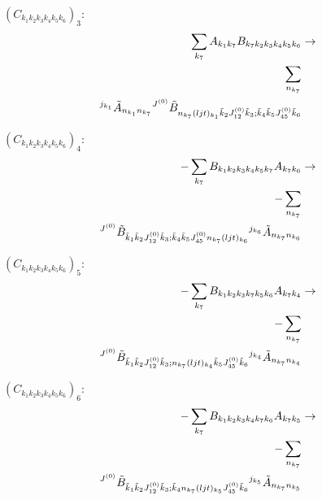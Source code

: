 \documentclass[11pt]{article}
\begin{document}
$\left({C}_{{k}_{1}{k}_{2}{k}_{3}{k}_{4}{k}_{5}{k}_{6}}\right)_{3}$:
\begin{align}
\sum_{{k}_{7}}{A}_{{k}_{1}{k}_{7}}{B}_{{k}_{7}{k}_{2}{k}_{3}{k}_{4}{k}_{5}{k}_{6}}&\rightarrow \notag \\\sum_{n_{{k}_{7}}}& \notag \\{}^{j_{{k}_{1}}}\tilde{A}_{n_{{k}_{1}}n_{{k}_{7}}}{}^{J^{(0)}}\tilde{B}_{n_{{k}_{7}}(ljt)_{{k}_{1}}\tilde{k}_{2}J^{(0)}_{12}\tilde{k}_{3};\tilde{k}_{4}\tilde{k}_{5}J^{(0)}_{45}\tilde{k}_{6}}& \notag \\
\end{align}

$\left({C}_{{k}_{1}{k}_{2}{k}_{3}{k}_{4}{k}_{5}{k}_{6}}\right)_{4}$:
\begin{align}
-\sum_{{k}_{7}}{B}_{{k}_{1}{k}_{2}{k}_{3}{k}_{4}{k}_{5}{k}_{7}}{A}_{{k}_{7}{k}_{6}}&\rightarrow \notag \\-\sum_{n_{{k}_{7}}}& \notag \\{}^{J^{(0)}}\tilde{B}_{\tilde{k}_{1}\tilde{k}_{2}J^{(0)}_{12}\tilde{k}_{3};\tilde{k}_{4}\tilde{k}_{5}J^{(0)}_{45}n_{{k}_{7}}(ljt)_{{k}_{6}}}{}^{j_{{k}_{6}}}\tilde{A}_{n_{{k}_{7}}n_{{k}_{6}}}& \notag \\
\end{align}

$\left({C}_{{k}_{1}{k}_{2}{k}_{3}{k}_{4}{k}_{5}{k}_{6}}\right)_{5}$:
\begin{align}
-\sum_{{k}_{7}}{B}_{{k}_{1}{k}_{2}{k}_{3}{k}_{7}{k}_{5}{k}_{6}}{A}_{{k}_{7}{k}_{4}}&\rightarrow \notag \\-\sum_{n_{{k}_{7}}}& \notag \\{}^{J^{(0)}}\tilde{B}_{\tilde{k}_{1}\tilde{k}_{2}J^{(0)}_{12}\tilde{k}_{3};n_{{k}_{7}}(ljt)_{{k}_{4}}\tilde{k}_{5}J^{(0)}_{45}\tilde{k}_{6}}{}^{j_{{k}_{4}}}\tilde{A}_{n_{{k}_{7}}n_{{k}_{4}}}& \notag \\
\end{align}

$\left({C}_{{k}_{1}{k}_{2}{k}_{3}{k}_{4}{k}_{5}{k}_{6}}\right)_{6}$:
\begin{align}
-\sum_{{k}_{7}}{B}_{{k}_{1}{k}_{2}{k}_{3}{k}_{4}{k}_{7}{k}_{6}}{A}_{{k}_{7}{k}_{5}}&\rightarrow \notag \\-\sum_{n_{{k}_{7}}}& \notag \\{}^{J^{(0)}}\tilde{B}_{\tilde{k}_{1}\tilde{k}_{2}J^{(0)}_{12}\tilde{k}_{3};\tilde{k}_{4}n_{{k}_{7}}(ljt)_{{k}_{5}}J^{(0)}_{45}\tilde{k}_{6}}{}^{j_{{k}_{5}}}\tilde{A}_{n_{{k}_{7}}n_{{k}_{5}}}& \notag \\
\end{align}
\end{document}
